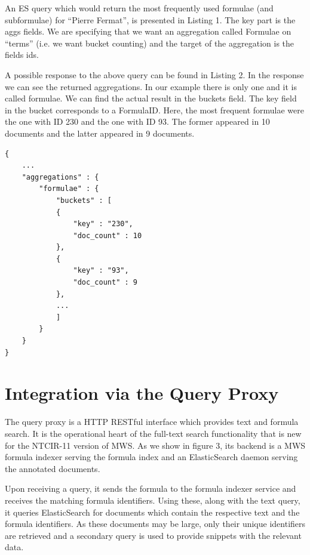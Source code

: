 \documentclass{deliverablereport}
\begin{document}
An ES query which would return the most frequently used formulae (and subformulae) for “Pierre Fermat”, is presented in Listing 1. The key part is the aggs fields. We are specifying that we want an aggregation called Formulae on “terms” (i.e. we want bucket counting) and the target of the aggregation is the fields ids. \par
A possible response to the above query can be found in Listing 2. In the response we can see the returned aggregations. In our example there is only one and it is called formulae. We can find the actual result in the buckets field. The key field in the bucket corresponds to a FormulaID. Here, the most frequent formulae were the one with ID 230 and the one with ID 93. The former appeared in 10 documents and the latter appeared in 9 documents. \par

\vspace{5mm}

\begin{lstlisting}[caption={Elastic Search Term Aggregation Response}]
{
	...
	"aggregations" : {
		"formulae" : {
			"buckets" : [
			{
				"key" : "230",
				"doc_count" : 10
			},
			{
				"key" : "93",
				"doc_count" : 9
			},
			...
			]
		}
	}
}
\end{lstlisting}



\section{Integration via the Query Proxy}\label{sec:proxy}

The query proxy is a HTTP RESTful interface which provides text and formula search. It is the operational heart of the full-text search functionality that is new for the NTCIR-11 version of MWS. As we show in figure 3, its backend is a MWS formula indexer serving the formula index and an ElasticSearch daemon serving the annotated documents. \par

Upon receiving a query, it sends the formula to the formula indexer service and receives the matching formula identifiers. Using these, along with the text query, it queries ElasticSearch for documents which contain the respective text and the formula identifiers. As these documents may be large, only their unique identifiers are retrieved and a secondary query is used to provide snippets with the relevant data. \par
\end{document}
